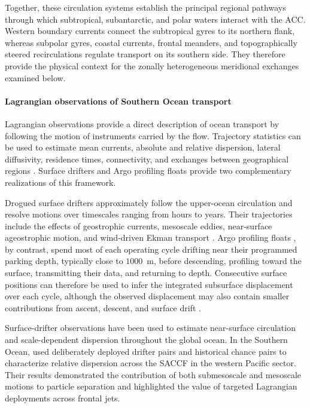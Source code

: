 \documentclass[
  draft
]{agujournal2025}
\begin{document}
        Together, these circulation systems establish the principal regional pathways through which subtropical, subantarctic, and polar waters interact with the ACC. Western boundary currents connect the subtropical gyres to its northern flank, whereas subpolar gyres, coastal currents, frontal meanders, and topographically steered recirculations regulate transport on its southern side. They therefore provide the physical context for the zonally heterogeneous meridional exchanges examined below.

    \paragraph{Lagrangian observations of Southern Ocean transport}

        Lagrangian observations provide a direct description of ocean transport by following the motion of instruments carried by the flow. Trajectory statistics can be used to estimate mean currents, absolute and relative dispersion, lateral diffusivity, residence times, connectivity, and exchanges between geographical regions \cite{art:lacasce2008}. Surface drifters and Argo profiling floats provide two complementary realizations of this framework.

        Drogued surface drifters approximately follow the upper-ocean circulation and resolve motions over timescales ranging from hours to years. Their trajectories include the effects of geostrophic currents, mesoscale eddies, near-surface ageostrophic motion, and wind-driven Ekman transport \cite{art:lumpkin2013, art:lumpkin2017, data:lumpkin2019}. Argo profiling floats \cite{art:davis1991, art:talley2019}, by contrast, spend most of each operating cycle drifting near their programmed parking depth, typically close to $1000$~m, before descending, profiling toward the surface, transmitting their data, and returning to depth. Consecutive surface positions can therefore be used to infer the integrated subsurface displacement over each cycle, although the observed displacement may also contain smaller contributions from ascent, descent, and surface drift \cite{art:ollitrault2013, art:roach2016, art:chamberlain2023}.

        Surface-drifter observations have been used to estimate near-surface circulation and scale-dependent dispersion throughout the global ocean. In the Southern Ocean, \cite{art:vansebille2015} used deliberately deployed drifter pairs and historical chance pairs to characterize relative dispersion across the SACCF in the western Pacific sector. Their results demonstrated the contribution of both submesoscale and mesoscale motions to particle separation and highlighted the value of targeted Lagrangian deployments across frontal jets.
\end{document}
